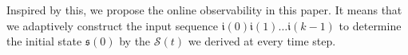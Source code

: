 Inspired by this, we propose the online observability in this paper. It means that we adaptively construct the input sequence $\mathfrak{i}(0)$$\mathfrak{i}(1)\ldots$$\mathfrak{i}(k-1)$ to determine the initial state $\mathfrak{s}(0)$ by the $\mathcal{S}(t)$ we derived at every time step. %


